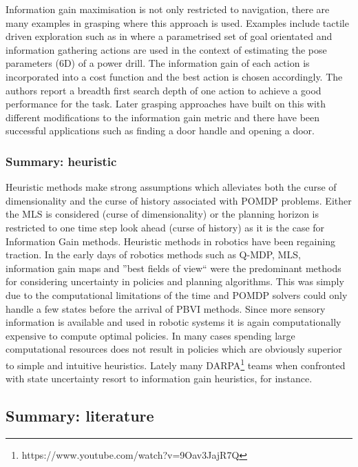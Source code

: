 Information gain maximisation is not only restricted to navigation, there are many examples in grasping where this approach is used. 
Examples include tactile driven exploration such as in \cite{Hsiao_RSS_10} where a parametrised set of goal orientated and information gathering actions are used in the context of estimating the pose parameters (6D) of a power drill. 
The information gain of each action is incorporated into a cost function and the best action is chosen accordingly. The authors report a breadth first search depth of one action to achieve a good performance for the task.
Later grasping approaches have built on this with different modifications to the information gain metric \cite{Efficient_touch_2012} and there have 
been successful applications such as finding a door handle \cite{next_best_touch} and opening a door.

\subsubsection{Summary: heuristic}

Heuristic methods make strong assumptions which alleviates both the curse of dimensionality and the curse of history associated with POMDP problems. 
Either the MLS is considered (curse of dimensionality) or the planning horizon is restricted to one time step look ahead (curse of history) as it is the case 
for Information Gain methods. Heuristic methods in robotics have been regaining traction. In the early days of robotics methods such as Q-MDP, MLS, 
information gain maps and ''best fields of view`` were the predominant methods for considering uncertainty in policies and planning algorithms. This was simply 
due to the computational limitations of the time and POMDP solvers could only handle a few states before the arrival of PBVI methods.  Since more 
sensory information is available and used in robotic systems it is again computationally expensive to compute optimal policies. In many cases 
spending large computational resources does not result in policies which are obviously superior to simple and intuitive heuristics. Lately many 
DARPA\footnote{https://www.youtube.com/watch?v=9Oav3JajR7Q} teams when confronted with state uncertainty resort to information gain heuristics, for instance. 

\subsection{Summary: literature}

